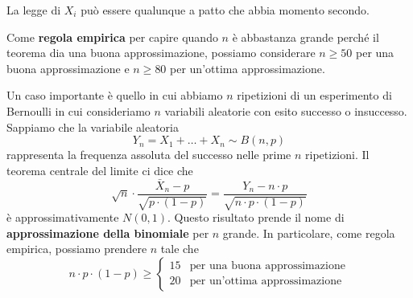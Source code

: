 \begin{observation}
	La legge di $X_i$ può essere qualunque a patto che abbia momento secondo.
\end{observation}

Come \textbf{regola empirica} per capire quando $n$ è abbastanza grande perché il teorema dia
una buona approssimazione, possiamo considerare $n \geq 50$ per una buona approssimazione e
$n \geq 80$ per un'ottima approssimazione.

Un caso importante è quello in cui abbiamo $n$ ripetizioni di un esperimento di Bernoulli in cui
consideriamo $n$ variabili aleatorie con esito successo o insuccesso. Sappiamo che la variabile
aleatoria
\[ Y_n = X_1 + \dots + X_n \sim B(n, p) \]
rappresenta la frequenza assoluta del successo nelle prime $n$ ripetizioni. Il teorema centrale del
limite ci dice che
\[
	\sqrt{n} \cdot \frac{\bar{X}_n - p}{\sqrt{p \cdot (1-p)}} =
	\frac{Y_n - n \cdot p}{\sqrt{n \cdot p \cdot (1-p)}}
\]
è approssimativamente $N(0,1)$. Questo risultato prende il nome di
\textbf{approssimazione della binomiale} per $n$ grande. In particolare, come regola empirica,
possiamo prendere $n$ tale che
\[
	n \cdot p \cdot (1 - p) \geq \begin{cases}
		15 & \text{per una buona approssimazione} \\
		20 & \text{per un'ottima approssimazione}
	\end{cases}
\]

